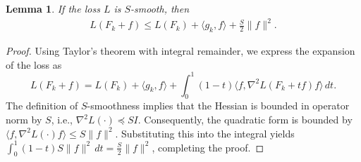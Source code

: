 \documentclass{article}
\theoremstyle{plain}
\newtheorem{lemma}[theorem]{Lemma}
\theoremstyle{definition}
\theoremstyle{remark}
\begin{document}




 

\begin{lemma}
    If the loss $L$ is $S$-smooth, then
    \begin{align}
        L(F_k+f) \leq L(F_k) + \langle g_k, f\rangle + \frac{S}{2} \|f\|^2.
    \end{align}
\end{lemma}
\begin{proof}
    Using Taylor's theorem with integral remainder, we express the expansion of the loss as
    \begin{equation}
        L(F_k+f) = L(F_k) + \langle g_k, f\rangle + \int_0^1 (1-t) \langle f, \nabla^2 L(F_k + tf) f \rangle \, dt.
    \end{equation}
    The definition of $S$-smoothness implies that the Hessian is bounded in operator norm by $S$, i.e., $\nabla^2 L(\cdot) \preceq S I$. Consequently, the quadratic form is bounded by $\langle f, \nabla^2 L(\cdot) f \rangle \leq S \|f\|^2$. Substituting this into the integral yields $\int_0^1 (1-t) S \|f\|^2 \, dt = \frac{S}{2}\|f\|^2$, completing the proof.
\end{proof}
\end{document}
